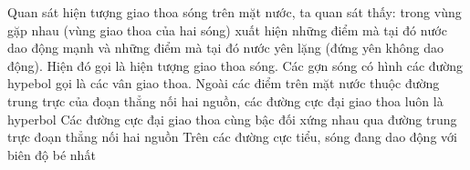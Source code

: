 \begin{ex}
Quan sát hiện tượng giao thoa sóng trên mặt nước, ta quan sát thấy: trong vùng gặp nhau (vùng giao thoa của hai sóng) xuất hiện những điểm mà tại đó nước dao động mạnh và những điểm mà tại đó nước yên lặng (đứng yên không dao động). Hiện đó gọi là hiện tượng giao thoa sóng. Các gợn sóng có hình các đường hypebol gọi là các vân giao thoa.
	{Ngoài các điểm trên mặt nước thuộc đường trung trực của đoạn thẳng nối hai nguồn, các đường cực đại giao thoa luôn là hyperbol}
	{\True Các đường cực đại giao thoa cùng bậc đối xứng nhau qua đường trung trực đoạn thẳng nối hai nguồn}
	{\True Trên các đường cực tiểu, sóng đang dao động với biên độ bé nhất}
\end{ex}
